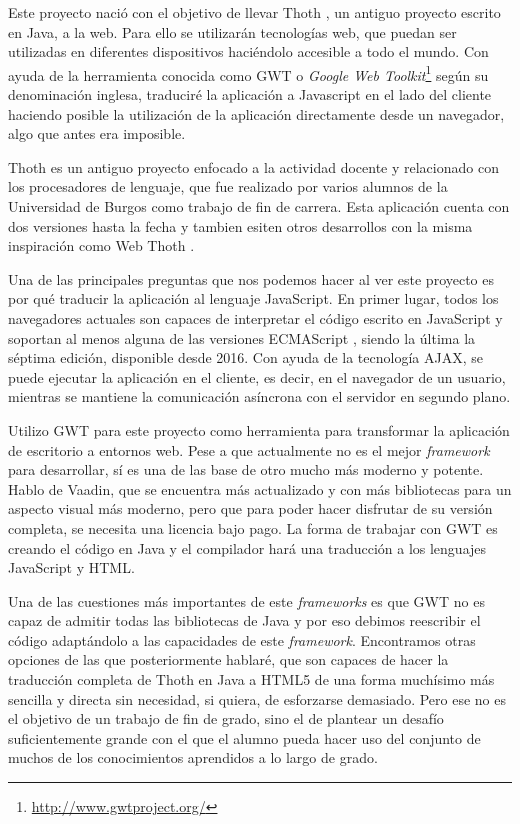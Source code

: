 
Este proyecto nació con el objetivo de llevar Thoth \cite{garcia2007ensenanza}, un antiguo proyecto escrito en Java, a la web. Para ello se utilizarán tecnologías web, que puedan ser utilizadas en diferentes dispositivos haciéndolo accesible a todo el mundo. Con ayuda de la herramienta conocida como GWT o \emph{Google Web Toolkit}\footnote{\url{http://www.gwtproject.org/}} según su denominación inglesa, traduciré la aplicación a Javascript en el lado del cliente haciendo posible la utilización de la aplicación directamente desde un navegador, algo que antes era imposible.

Thoth \cite{garcia2007ensenanza}
 es un antiguo proyecto enfocado a la actividad docente y relacionado con los procesadores de lenguaje, que fue realizado por varios alumnos de la Universidad de Burgos como trabajo de fin de carrera. Esta aplicación cuenta con dos versiones  hasta la fecha y tambien esiten otros desarrollos con la misma inspiración como Web Thoth \cite{jute2017}.

Una de las principales preguntas que nos podemos hacer al ver este proyecto es por qué traducir la aplicación al lenguaje JavaScript. 
En primer lugar, todos los navegadores actuales son capaces de interpretar el código escrito en JavaScript y soportan al menos alguna de las versiones ECMAScript \cite{ecma:versiones}, siendo la última la séptima edición, disponible desde 2016. Con ayuda de la tecnología AJAX, se puede ejecutar la aplicación en el cliente, es decir, en el navegador de un usuario, mientras se mantiene la comunicación asíncrona con el servidor en segundo plano.

Utilizo GWT para este proyecto como herramienta para transformar la aplicación de escritorio a entornos web. Pese a que actualmente no es el mejor \emph{framework} para desarrollar, sí es una de las base de otro mucho más moderno y potente. Hablo de Vaadin, que se encuentra más actualizado y con más bibliotecas para un aspecto visual más moderno, pero que para poder hacer disfrutar de su versión completa, se necesita una licencia bajo pago. La forma de trabajar con GWT es creando el código en Java y el compilador hará una traducción a los lenguajes JavaScript y HTML.

Una de las cuestiones más importantes de este \emph{frameworks} es que GWT no es capaz de admitir todas las bibliotecas de Java y por eso debimos reescribir el código adaptándolo a las capacidades de este \emph{framework}. Encontramos otras opciones de las que posteriormente hablaré, que son capaces de hacer la traducción completa de Thoth en Java a HTML5 de una forma muchísimo más sencilla y directa sin necesidad, si quiera, de esforzarse demasiado. Pero ese no es el objetivo de un trabajo de fin de grado, sino el de plantear un desafío suficientemente grande con el que el alumno pueda hacer uso del conjunto de muchos de los conocimientos aprendidos a lo largo de grado.
